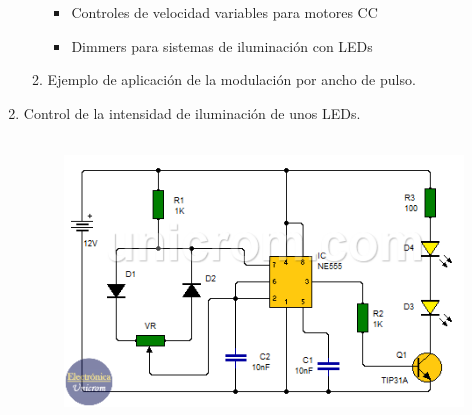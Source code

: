\documentclass[12pt]{article}
\begin{document}
\begin{enumerate}
\begin{enumerate}
\begin{itemize}
	\item Controles de velocidad variables para motores CC \par

	\item Dimmers para sistemas de iluminación con LEDs 
\end{itemize}\par

	\item \textcolor[HTML]{0066B3}{Ejemplo de aplicación de la modulación por ancho de pulso.}
\end{enumerate}\par

	\item \textcolor[HTML]{0066B3}{Control de la intensidad de iluminación de unos LEDs.}\par




\begin{figure}[H]
	\begin{Center}
		\includegraphics[width=4.75in,height=2.99in]{./media/image3.png}
	\end{Center}
\end{figure}



\par


\vspace{\baselineskip}

\end{enumerate}
\vspace{\baselineskip}
\end{document}
